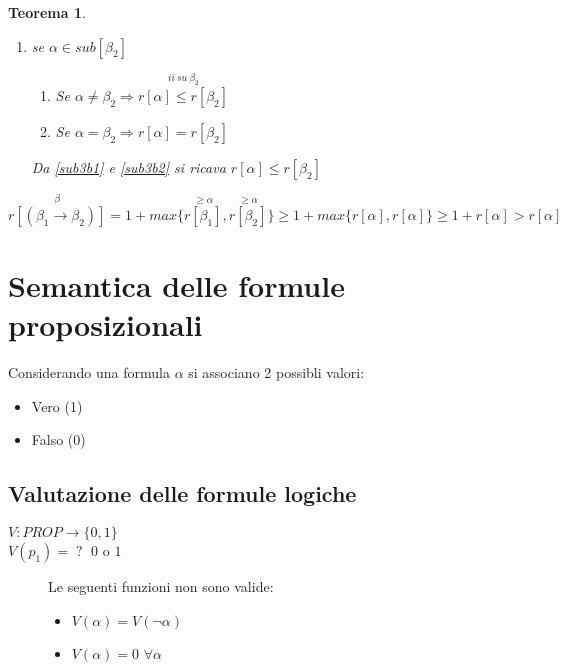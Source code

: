 \documentclass{article}
\newtheorem{theorem}{Teorema}
\theoremstyle{break}
\theoremstyle{break}
\theoremstyle{break}
\theoremstyle{break}
\begin{document}
\begin{theorem}
\begin{enumerate}
\begin{enumerate}
          Da \ref{sub3a1} e \ref{sub3a2} si ricava \( r[\alpha] \le r[\beta_1] \)
        \item se \( \alpha \in sub[\beta_2] \)
          \begin{enumerate}
            \item \label{sub3b1} Se \( \alpha \neq \beta_2 \Rightarrow
              \stackrel{ii\: su\: \beta_{2} }{r[\alpha] \le r[\beta_2]} \)
            \item \label{sub3b2} Se \( \alpha = \beta_2 \Rightarrow r[\alpha] = r[\beta_2]\)
          \end{enumerate}
          Da \ref{sub3b1} e \ref{sub3b2} si ricava \( r[\alpha] \le r[\beta_2] \)
      \end{enumerate}
      \[
        \stackrel{\beta}{r[(\beta_1 \to \beta_2)]} = 1 + max\{\stackrel{\ge \alpha}{r[\beta_1]}
        ,\stackrel{\ge \alpha}{r[\beta_2]}\}\ge 1+ max\{r[\alpha], r[\alpha]\}
        \ge 1+ r[\alpha] > r[\alpha]
      \]
  \end{enumerate}
\end{theorem}

\section{Semantica delle formule proposizionali}
Considerando una formula \( \alpha \) si associano 2 possibli valori:
\begin{itemize}
  \item Vero (1)
  \item Falso (0)
\end{itemize}

\subsection{Valutazione delle formule logiche}
\( V: PROP \to \{ 0, 1 \} \)\\
\( V(p_1) =\; ?\;\) \( 0 \) o \( 1 \)
\begin{figure}[H]
  \begin{example}
    Le seguenti funzioni non sono valide:
    \begin{itemize}
      \item \( V(\alpha) = V(\neg \alpha) \)
      \item \( V(\alpha) = 0 \) \( \forall \alpha \)
    \end{itemize}
  \end{example}
\end{figure}
\end{document}
